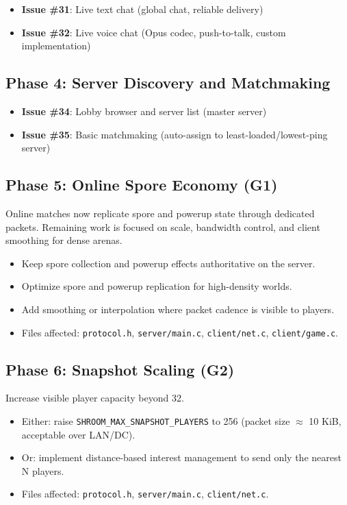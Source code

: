 \documentclass[11pt]{article}
\begin{document}
\begin{itemize}
  \item \textbf{Issue \#31}: Live text chat (global chat, reliable delivery)
  \item \textbf{Issue \#32}: Live voice chat (Opus codec, push-to-talk, custom implementation)
\end{itemize}

\subsection{Phase 4: Server Discovery and Matchmaking}

\begin{itemize}
  \item \textbf{Issue \#34}: Lobby browser and server list (master server)
  \item \textbf{Issue \#35}: Basic matchmaking (auto-assign to least-loaded/lowest-ping server)
\end{itemize}

\subsection{Phase 5: Online Spore Economy (G1)}

Online matches now replicate spore and powerup state through dedicated packets. Remaining work is focused on scale, bandwidth control, and client smoothing for dense arenas.

\begin{itemize}
  \item Keep spore collection and powerup effects authoritative on the server.
  \item Optimize spore and powerup replication for high-density worlds.
  \item Add smoothing or interpolation where packet cadence is visible to players.
  \item Files affected: \texttt{protocol.h}, \texttt{server/main.c}, \texttt{client/net.c}, \texttt{client/game.c}.
\end{itemize}

\subsection{Phase 6: Snapshot Scaling (G2)}

Increase visible player capacity beyond 32.

\begin{itemize}
  \item Either: raise \texttt{SHROOM\_MAX\_SNAPSHOT\_PLAYERS} to 256 (packet size $\approx$ 10 KiB, acceptable over LAN/DC).
  \item Or: implement distance-based interest management to send only the nearest N players.
  \item Files affected: \texttt{protocol.h}, \texttt{server/main.c}, \texttt{client/net.c}.
\end{itemize}
\end{document}
